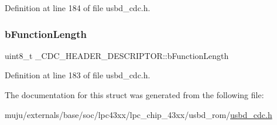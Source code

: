 Definition at line 184 of file usbd\+\_\+cdc.\+h.

\mbox{\label{struct___c_d_c___h_e_a_d_e_r___d_e_s_c_r_i_p_t_o_r_a0b88951b1e043616876d35573a6d85ed}} 
\subsubsection{\texorpdfstring{b\+Function\+Length}{bFunctionLength}}
{\footnotesize\ttfamily uint8\+\_\+t \+\_\+\+C\+D\+C\+\_\+\+H\+E\+A\+D\+E\+R\+\_\+\+D\+E\+S\+C\+R\+I\+P\+T\+O\+R\+::b\+Function\+Length}



Definition at line 183 of file usbd\+\_\+cdc.\+h.



The documentation for this struct was generated from the following file\+:\begin{DoxyCompactItemize}
\item 
muju/externals/base/soc/lpc43xx/lpc\+\_\+chip\+\_\+43xx/usbd\+\_\+rom/\hyperlink{usbd__cdc_8h}{usbd\+\_\+cdc.\+h}\end{DoxyCompactItemize}

